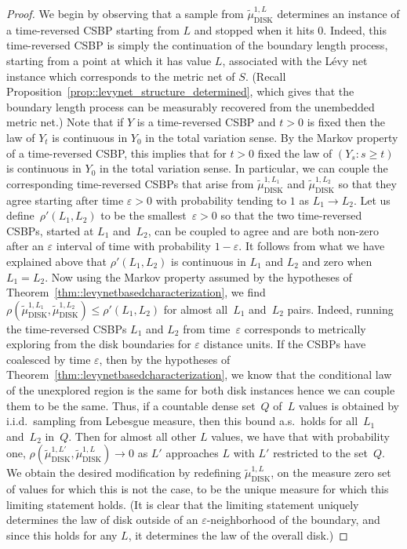 \documentclass[JEP,XML,SOM,Unicode]{cedram}
\let\epsilon\varepsilon
\theoremstyle{plain}
\numberwithin{theorem}{section}
\theoremstyle{definition}
\newcommand{\tmudonel}{\wt{\mu}_{ \mathrm{DISK}}^{1, L}}
\def\tmudonelset#1{\wt{\mu}_{ \mathrm{DISK}}^{1, #1}}
\let\wt\widetilde
\begin{document}
\begin{proof}
We begin by observing that a sample from $\tmudonel$ determines an instance of a time-reversed CSBP starting from $L$ and stopped when it hits $0$. Indeed, this time-reversed CSBP is simply the continuation of the boundary length process, starting from a point at which it has value $L$, associated with the Lévy net instance which corresponds to the metric net of $S$. (Recall Proposition~\ref{prop::levynet_structure_determined}, which gives that the boundary length process can be measurably recovered from the unembedded metric net.) Note that if $Y$ is a time-reversed CSBP and $t > 0$ is fixed then the law of $Y_t$ is continuous in $Y_0$ in the total variation sense. By the Markov property of a time-reversed CSBP, this implies that for $t > 0$ fixed the law of $(Y_s : s \geq t)$ is continuous in $Y_0$ in the total variation sense. In particular, we can couple the corresponding time-reversed CSBPs that arise from $\tmudonelset{L_1}$ and $\tmudonelset{L_2}$ so that they agree starting after time $\epsilon > 0$ with probability tending to $1$ as $L_1 \to L_2$. Let us define~$\rho'(L_1, L_2)$ to be the smallest~$\epsilon > 0$ so that the two time-reversed CSBPs, started at $L_1$ and~$L_2$, can be coupled to agree and are both non-zero after an $\epsilon$ interval of time with probability $1-\epsilon$. It follows from what we have explained above that $\rho'(L_1, L_2)$ is continuous in $L_1$ and $L_2$ and zero when $L_1 = L_2$. Now using the Markov property assumed by the hypotheses of Theorem~\ref{thm::levynetbasedcharacterization}, we find $\rho(\tmudonelset{L_1}, \tmudonelset{L_2}) \leq \rho'(L_1, L_2)$ for almost all~$L_1$ and~$L_2$ pairs. Indeed, running the time-reversed CSBPs $L_1$ and $L_2$ from time~$\epsilon$ corresponds to metrically exploring from the disk boundaries for $\epsilon$ distance units. If the CSBPs have coalesced by time $\epsilon$, then by the hypotheses of Theorem~\ref{thm::levynetbasedcharacterization}, we know that the conditional law of the unexplored region is the same for both disk instances hence we can couple them to be the same. Thus, if a countable dense set~$Q$ of~$L$ values is obtained by i.i.d.\ sampling from Lebesgue measure, then this bound a.s.\ holds for all~$L_1$ and~$L_2$ in~$Q$. Then for almost all other $L$ values, we have that with probability one, $\rho(\tmudonelset{L'}, \tmudonelset{L}) \to 0$ as $L'$ approaches $L$ with $L'$ restricted to the set~$Q$. We obtain the desired modification by redefining $\tmudonelset{L}$, on the measure zero set of values for which this is not the case, to be the unique measure for which this limiting statement holds. (It is clear that the limiting statement uniquely determines the law of disk outside of an $\epsilon$-neighborhood of the boundary, and since this holds for any $L$, it determines the law of the overall disk.)
\end{proof}
\end{document}
